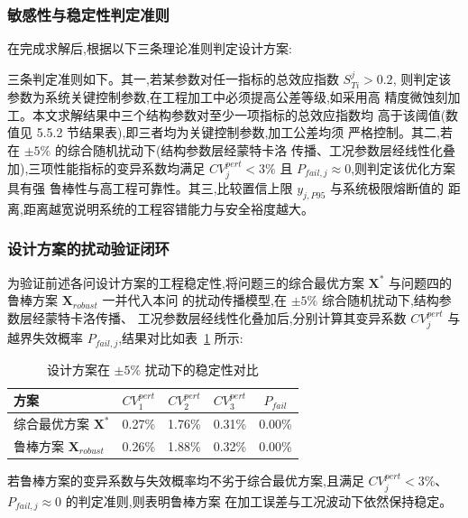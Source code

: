 \subsubsection{敏感性与稳定性判定准则}

在完成求解后,根据以下三条理论准则判定设计方案:

三条判定准则如下。其一,若某参数对任一指标的总效应指数 $S_{Ti}^j > 0.2$,
则判定该参数为系统关键控制参数,在工程加工中必须提高公差等级,如采用高
精度微蚀刻加工。本文求解结果中三个结构参数对至少一项指标的总效应指数均
高于该阈值(数值见 5.5.2 节结果表),即三者均为关键控制参数,加工公差均须
严格控制。其二,若在 $\pm 5\%$ 的综合随机扰动下(结构参数层经蒙特卡洛
传播、工况参数层经线性化叠加),三项性能指标的变异系数均满足
$CV_j^{pert} < 3\%$ 且 $P_{fail, j} \approx 0$,则判定该优化方案具有强
鲁棒性与高工程可靠性。其三,比较置信上限 $y_{j, P95}$ 与系统极限熔断值的
距离,距离越宽说明系统的工程容错能力与安全裕度越大。

\subsubsection{设计方案的扰动验证闭环}

为验证前述各问设计方案的工程稳定性,将问题三的综合最优方案
$\mathbf{X}^*$ 与问题四的鲁棒方案 $\mathbf{X}_{robust}$ 一并代入本问
的扰动传播模型,在 $\pm 5\%$ 综合随机扰动下,结构参数层经蒙特卡洛传播、
工况参数层经线性化叠加后,分别计算其变异系数 $CV_j^{pert}$ 与越界失效概率
$P_{fail, j}$,结果对比如表~\ref{tab:q5-compare} 所示:

\begin{table}[htbp]
  \centering
  \caption{设计方案在 $\pm 5\%$ 扰动下的稳定性对比}
  \label{tab:q5-compare}
  \begin{tabular}{lcccc}
    \toprule
    方案                         & $CV_1^{pert}$ & $CV_2^{pert}$ & $CV_3^{pert}$ & $P_{fail}$ \\
    \midrule
    综合最优方案 $\mathbf{X}^*$      & 0.27\%        & 1.76\%        & 0.31\%        & 0.00\%     \\
    鲁棒方案 $\mathbf{X}_{robust}$ & 0.26\%        & 1.88\%        & 0.32\%        & 0.00\%     \\
    \bottomrule
  \end{tabular}
\end{table}

若鲁棒方案的变异系数与失效概率均不劣于综合最优方案,且满足
$CV_j^{pert} < 3\%$、$P_{fail, j} \approx 0$ 的判定准则,则表明鲁棒方案
在加工误差与工况波动下依然保持稳定。
